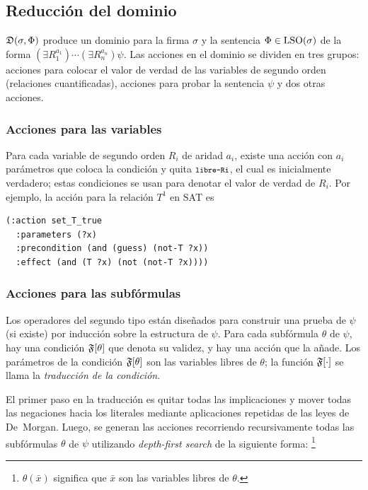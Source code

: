 
\subsection{Reducción del dominio}

$\mathfrak{D}(\sigma,\Phi)$ produce un dominio para la firma
$\sigma$ y la sentencia $\Phi\in\text{LSO}(\sigma)$ de la forma
$(\exists R_1^{a_1})\cdots(\exists R_n^{a_n})\psi$.
Las acciones en el dominio se dividen en tres grupos: acciones para 
colocar el valor de verdad de las variables de segundo orden (relaciones
cuantificadas), acciones para probar la sentencia $\psi$ y dos otras acciones.

\subsubsection{Acciones para las variables}
Para cada variable de segundo orden $R_i$ de aridad $a_i$,
existe una acción  con $a_i$ parámetros que
coloca la condición  y quita ${\texttt{\footnotesize libre-Ri}}$, el cual es
inicialmente verdadero; estas condiciones se usan para denotar el valor de
verdad de $R_i$. Por ejemplo, la acción para la relación $T^1$ en SAT es

{\footnotesize
\begin{Verbatim}
(:action set_T_true
  :parameters (?x)
  :precondition (and (guess) (not-T ?x))
  :effect (and (T ?x) (not (not-T ?x))))
\end{Verbatim}
}

\subsubsection{Acciones para las subfórmulas}
Los operadores del segundo tipo están diseñados para construir una prueba de
$\psi$ (si existe) por inducción sobre la estructura de $\psi$.
Para cada subfórmula $\theta$ de $\psi$, hay una condición
$\mathfrak{F}[\theta]$ que denota su validez, y hay una acción que la añade.
Los parámetros de la condición $\mathfrak{F}[\theta]$ son las variables libres de
$\theta$; la función $\mathfrak{F}[\cdot]$ se llama la \textit{traducción de la
condición}.

El primer paso en la traducción es quitar todas las implicaciones
y mover todas las negaciones hacia los literales mediante aplicaciones
repetidas de las leyes de De~Morgan. Luego, se generan las acciones recorriendo
recursivamente todas las subfórmulas $\theta$ de $\psi$ utilizando
\textit{depth-first search} de la siguiente forma:
\footnote{$\theta(\bar x)$ significa que
$\bar x$ son las variables libres de $\theta$.}

